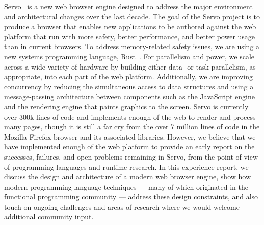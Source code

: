 Servo~\cite{SERVO} is a new web browser engine designed to address the major environment and 
architectural changes over the last decade.
The goal of the Servo project is to produce a browser that enables new applications to be authored
against the web platform that run with more safety, better performance, and better power usage
than in current browsers.
To address memory-related safety issues, we are using a new systems programming language,
Rust~\cite{RUST}.
For parallelism and power, we scale across a wide variety of hardware by building either data-
or task-parallelism, as appropriate, into each part of the web platform.
Additionally, we are improving concurrency by reducing the simultaneous access to data
structures and using a message-passing architecture between components such as the
JavaScript engine and the rendering engine that paints graphics to the screen.
Servo is currently over 300k lines of code and implements enough of the web to render and
process many pages, though it is still a far cry from the over 7 million lines of code in
the Mozilla Firefox browser and its associated libraries.
However, we believe that we have implemented enough of the web platform to provide an
early report on the successes, failures, and open problems remaining in Servo, from the
point of view of programming languages and runtime research.
In this experience report, we discuss the design and architecture of a modern web 
browser engine, show how modern programming language techniques --- many of which
originated in the functional programming community --- address these design 
constraints, and also touch on ongoing challenges and areas of research where we
would welcome additional community input.

